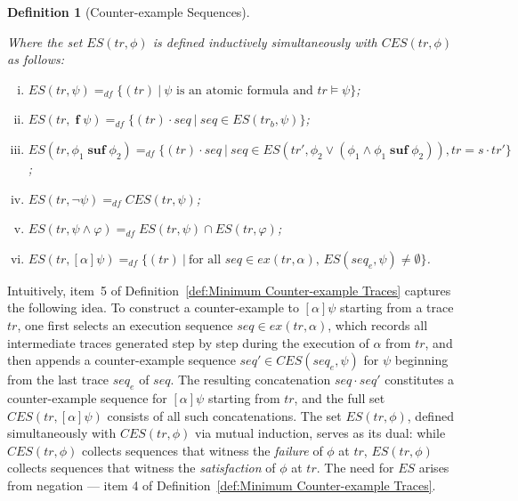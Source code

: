\documentclass[manuscript,screen]{acmart}
\newtheorem{definition}{Definition}[section]
\newcommand{\dddef}[0]{=_{df}}
\newcommand{\EX}[0]{\textit{CES}}
\newcommand{\EXA}[0]{\textit{ES}}
\newcommand{\ex}[0]{\textit{ex}}
\DeclareMathOperator{\ofst}{\mathbf{f}}
\DeclareMathOperator{\osuf}{\mathbf{suf}}
\newcommand{\str}[0]{str}
\newcommand{\CET}[0]{\textit{CT}}
\newcommand{\A}[1]{\mbox{ \textbf{#1} }}
\newcommand{\MO}{\A{MO}}
\begin{document}
\begin{definition}[Counter-example Sequences]
\begin{enumerate}
    \end{enumerate}
    Where the set $\EXA(tr, \phi)$ is defined inductively simultaneously with $\EX(tr, \phi)$ as follows:
    \begin{enumerate}[i.]
    \item $\EXA(tr, \psi)\dddef \{(tr)\ |\ \mbox{$\psi$ is an atomic formula and $tr\models \psi$}\}$;
    \item $\EXA(tr, \ofst\psi)\dddef \{(tr)\cdot seq\ |\ seq\in \EXA(tr_b, \psi)\}$;
    \item $\EXA(tr, \phi_1\osuf \phi_2)\dddef \{(tr)\cdot seq\ |\ seq\in \EXA(tr', \phi_2\vee (\phi_1\wedge \phi_1\osuf\phi_2)), tr = s\cdot tr'\}$;
    \item $\EXA(tr, \neg\psi) \dddef \EX(tr, \psi)$;
    \item $\EXA(tr, \psi\wedge \varphi)\dddef \EXA(tr, \psi)\cap \EXA(tr, \varphi)$;
    \item $\EXA(tr, [\alpha]\psi)\dddef \{(tr)\ |\ \mbox{for all $seq\in \ex(tr, \alpha)$, $\EXA(seq_e, \psi)\neq \emptyset$}\}$.
    \end{enumerate}
\end{definition}
\fi

\ifx
Intuitively, item~5 of Definition~\ref{def:Minimum Counter-example Traces} captures the following idea.  To construct a counter-example to $[\alpha]\psi$ starting from a trace $tr$, one first selects an execution sequence $seq \in \ex(tr, \alpha)$, which records all intermediate traces generated step by step during the execution of $\alpha$ from $tr$, and then appends a counter-example sequence $seq' \in \EX(seq_e, \psi)$ for $\psi$ beginning from the last trace $seq_e$ of $seq$.  The resulting concatenation $seq \cdot seq'$ constitutes a counter-example sequence for $[\alpha]\psi$ starting from $tr$, and the full set $\EX(tr, [\alpha]\psi)$ consists of all such concatenations. 
The set $\EXA(tr, \phi)$, defined simultaneously with $\EX(tr, \phi)$ via mutual induction, serves as its dual: while $\EX(tr, \phi)$ collects sequences that witness the \emph{failure} of $\phi$ at $tr$, $\EXA(tr, \phi)$ collects sequences that witness the \emph{satisfaction} of $\phi$ at $tr$.  The need for $\EXA$ arises from negation --- item 4 of Definition~\ref{def:Minimum Counter-example Traces}.  
\fi
\end{document}
